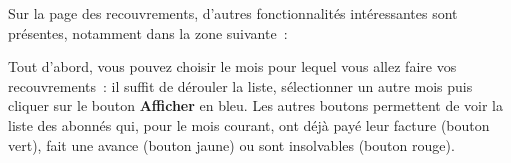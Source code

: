 Sur la page des recouvrements, d'autres fonctionnalités intéressantes sont présentes, notamment dans la zone suivante~:


Tout d'abord, vous pouvez choisir le mois pour lequel vous allez faire vos recouvrements~: il suffit de dérouler la liste, sélectionner un autre mois puis cliquer sur le bouton \textbf{Afficher} en bleu. Les autres boutons permettent de voir la liste des abonnés qui, pour le mois courant, ont déjà payé leur facture (bouton vert), fait une avance (bouton jaune) ou sont insolvables (bouton rouge).
